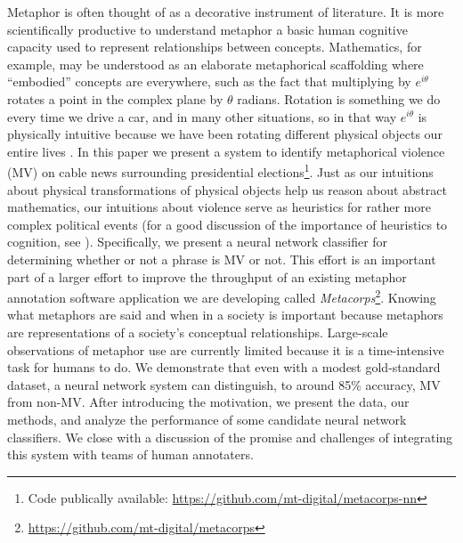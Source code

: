 \documentclass[11pt,letterpaper]{amsart}
\begin{document}
Metaphor is often thought of as a decorative instrument of literature.
It is more scientifically productive to understand metaphor a basic
human cognitive capacity used to represent relationships between concepts.
Mathematics, for example, may be understood as an elaborate metaphorical
scaffolding where ``embodied'' concepts are everywhere, such as the fact
that multiplying by \(e^{i\theta}\) rotates a point in the complex plane by \(\theta\)
radians. Rotation is something we do every time we drive a car, and in many 
other situations, so in
that way \(e^{i\theta}\) is physically intuitive because we have been
rotating different physical objects our entire 
lives \cite{Nunez1999, Núñez2000, Alibali2014}. 
In this paper we present a system to identify metaphorical violence (MV) 
on cable news surrounding presidential elections\footnote{Code publically available: \url{https://github.com/mt-digital/metacorps-nn}}. Just as our intuitions about
physical transformations
of physical objects help us reason about abstract mathematics, our intuitions
about violence serve as heuristics for rather more complex political events 
(for a good discussion of the
importance of heuristics to cognition, see \cite{Gigerenzer2009}).
Specifically, we present a neural network classifier for
determining whether or not a phrase is MV or not. This effort is an
important part of a larger effort to improve the throughput of an
existing metaphor annotation software application we are developing
called \emph{Metacorps}\footnote{\url{https://github.com/mt-digital/metacorps}}. 
Knowing what metaphors are said and
when in a society is important because metaphors are representations of
a society's conceptual relationships. Large-scale observations of
metaphor use are currently limited because it is a time-intensive task
for humans to do. We demonstrate that even with a modest gold-standard
dataset, a neural network system can distinguish, to around 85\%
accuracy, MV from non-MV. After introducing the motivation, we present
the data, our methods, and analyze the performance of some candidate
neural network classifiers. We close with a discussion of the promise
and challenges of integrating this system with teams of human
annotaters.
\end{document}
